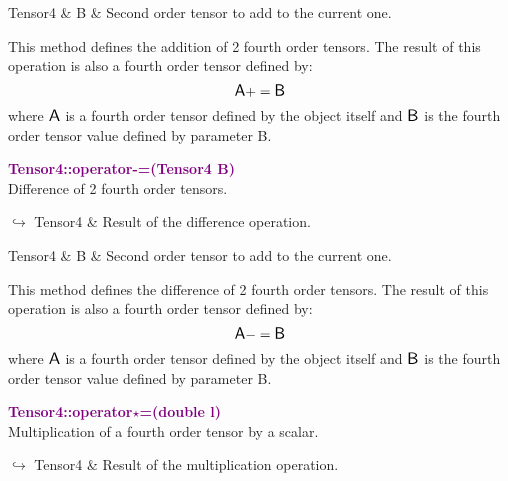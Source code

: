 \begin{tcolorbox}[width=\textwidth,myArgs,tabularx={ll|R}]
Tensor4 & B & Second order tensor to add to the current one.
\end{tcolorbox}

This method defines the addition of 2 fourth order tensors.
The result of this operation is also a fourth order tensor defined by:
\begin{equation*}
\mbox{\large\ensuremath{\mathsf{A}}} += \mbox{\large\ensuremath{\mathsf{B}}}
\end{equation*}
where $\mbox{\large\ensuremath{\mathsf{A}}}$ is a fourth order tensor defined by the object itself and $\mbox{\large\ensuremath{\mathsf{B}}}$ is the fourth order tensor value defined by parameter B.

\textcolor{purple}{\textbf{Tensor4::operator-=(Tensor4 B)}}\label{Tensor4::operator-=(Tensor4 B)}\\
Difference of 2 fourth order tensors.\vspace*{-0.5em}
\begin{tcolorbox}[grow to left by=-1cm, width=\textwidth-1cm,myArgs,tabularx={l|R}]
$\hookrightarrow$ Tensor4 & Result of the difference operation.
\end{tcolorbox}

\begin{tcolorbox}[width=\textwidth,myArgs,tabularx={ll|R}]
Tensor4 & B & Second order tensor to add to the current one.
\end{tcolorbox}

This method defines the difference of 2 fourth order tensors.
The result of this operation is also a fourth order tensor defined by:
\begin{equation*}
\mbox{\large\ensuremath{\mathsf{A}}} -= \mbox{\large\ensuremath{\mathsf{B}}}
\end{equation*}
where $\mbox{\large\ensuremath{\mathsf{A}}}$ is a fourth order tensor defined by the object itself and $\mbox{\large\ensuremath{\mathsf{B}}}$ is the fourth order tensor value defined by parameter B.

\textcolor{purple}{\textbf{Tensor4::operator$\star$=(double l)}}\label{Tensor4::operator*=(double l)}\\
Multiplication of a fourth order tensor by a scalar.\vspace*{-0.5em}
\begin{tcolorbox}[grow to left by=-1cm, width=\textwidth-1cm,myArgs,tabularx={l|R}]
$\hookrightarrow$ Tensor4 & Result of the multiplication operation.
\end{tcolorbox}

